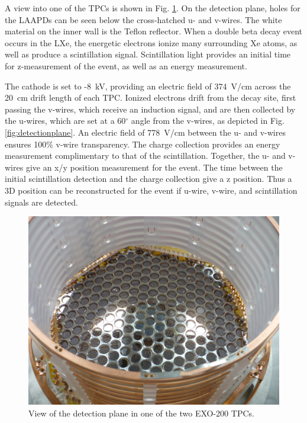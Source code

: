 A view into one of the TPCs is shown in Fig. \ref{fig:tpcphoto}.  On the detection plane, holes for the LAAPDs can be seen below the cross-hatched u- and v-wires.  The white material on the inner wall is the Teflon reflector.  When a double beta decay event occurs in the LXe, the energetic electrons ionize many surrounding Xe atoms, as well as produce a scintillation signal.  Scintillation light provides an initial time for z-measurement of the event, as well as an energy measurement.

The cathode is set to -8~kV, providing an electric field of 374~V/cm across the 20~cm drift length of each TPC.  Ionized electrons drift from the decay site, first passing the v-wires, which receive an induction signal, and are then collected by the u-wires, which are set at a 60$^\circ$ angle from the v-wires, as depicted in Fig. \ref{fig:detectionplane}.  An electric field of 778~V/cm between the u- and v-wires ensures 100\% v-wire transparency.  The charge collection provides an energy measurement complimentary to that of the scintillation.  Together, the u- and v-wires give an x/y position measurement for the event.  The time between the initial scintillation detection and the charge collection give a z position.  Thus a 3D position can be reconstructed for the event if u-wire, v-wire, and scintillation signals are detected.  \cite{EXO200TwoNuLong}  



\begin{figure} %
	\centering
	\includegraphics[width=.9\textwidth]{figures/TPCphoto.jpeg}
	\caption{View of the detection plane in one of the two EXO-200 TPCs.}
\label{fig:tpcphoto}
\end{figure}

